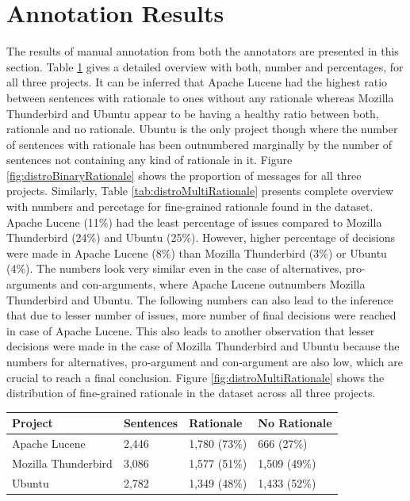 \documentclass[a4paper,12pt,twoside]{report}
\begin{document}
\section{Annotation Results}
The results of manual annotation from both the annotators are presented in this section. Table \ref{tab:distroBinaryRationale} gives a detailed overview with both, number and percentages, for all three projects. It can be inferred that Apache Lucene had the highest ratio between sentences with rationale to ones without any rationale whereas Mozilla Thunderbird and Ubuntu appear to be having a healthy ratio between both, rationale and no rationale. Ubuntu is the only project though where the number of sentences with rationale has been outnumbered marginally by the number of sentences not containing any kind of rationale in it. Figure \ref{fig:distroBinaryRationale} shows the proportion of messages for all three projects. Similarly, Table \ref{tab:distroMultiRationale} presents complete overview with numbers and percetage for fine-grained rationale found in the dataset. Apache Lucene (11\%) had the least percentage of issues compared to Mozilla Thunderbird (24\%) and Ubuntu (25\%). However, higher percentage of decisions were made in Apache Lucene (8\%) than Mozilla Thunderbird (3\%) or Ubuntu (4\%). The numbers look very similar even in the case of alternatives, pro-arguments and con-arguments, where Apache Lucene outnumbers Mozilla Thunderbird and Ubuntu. The following numbers can also lead to the inference that due to lesser number of issues, more number of final decisions were reached in case of Apache Lucene. This also leads to another observation that lesser decisions were made in the case of Mozilla Thunderbird and Ubuntu because the numbers for alternatives, pro-argument and con-argument are also low, which are crucial to reach a final conclusion. Figure \ref{fig:distroMultiRationale} shows the distribution of fine-grained rationale in the dataset across all three projects. 

\begin{table} %
    \centering
    \begin{adjustbox}{max width=\columnwidth}
    \def\arraystretch{1} %
    \begin{tabular}{p{4cm} p{3cm} p{3cm} p{3cm}}
        \toprule
        \textbf{Project} & \textbf{Sentences} & \textbf{Rationale} & \textbf{No Rationale}\\
        \midrule
			Apache Lucene & 2,446 & 1,780 (73\%) & 666 (27\%)\\
			Mozilla Thunderbird & 3,086 & 1,577 (51\%) & 1,509 (49\%)\\ 
			Ubuntu & 2,782 & 1,349 (48\%) & 1,433 (52\%)\\
        \midrule
    \end{tabular}
    \end{adjustbox}
    \label{tab:distroBinaryRationale}
\end{table}
\end{document}
